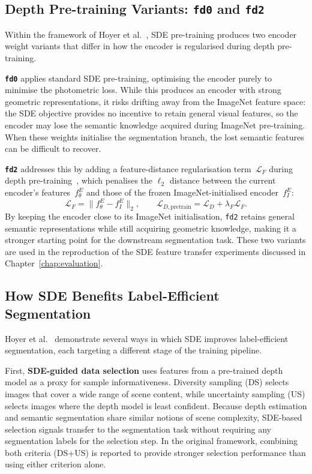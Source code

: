 \subsection{Depth Pre-training Variants: \texttt{fd0} and \texttt{fd2}}
\label{sec:fd0-fd2}

Within the framework of Hoyer et al.~\cite{hoyer2023improving}, SDE
pre-training produces two encoder weight variants that differ in how the
encoder is regularised during depth pre-training.

\textbf{\texttt{fd0}} applies standard SDE pre-training, optimising the
encoder purely to minimise the photometric loss. While this produces an
encoder with strong geometric representations, it risks drifting away
from the ImageNet feature space: the SDE objective provides no incentive
to retain general visual features, so the encoder may lose the semantic
knowledge acquired during ImageNet pre-training. When these weights
initialise the segmentation branch, the lost semantic features can be
difficult to recover.

\textbf{\texttt{fd2}} addresses this by adding a feature-distance
regularisation term~$\mathcal{L}_F$ during depth
pre-training~\cite{hoyer2023improving}, which penalises the $\ell_2$
distance between the current encoder's features~$f^E_\theta$ and those
of the frozen ImageNet-initialised encoder~$f^E_I$:
\[
    \mathcal{L}_F = \| f^E_\theta - f^E_I \|_2,
    \qquad
    \mathcal{L}_{D,\text{pretrain}} = \mathcal{L}_D + \lambda_F \mathcal{L}_F.
\]
By keeping the encoder close to its ImageNet initialisation, \texttt{fd2}
retains general semantic representations while still acquiring geometric
knowledge, making it a stronger starting point for the downstream
segmentation task. These two variants are used in the reproduction of the
SDE feature transfer experiments discussed in Chapter~\ref{chap:evaluation}.

\subsection{How SDE Benefits Label-Efficient Segmentation}

Hoyer et al.~\cite{hoyer2023improving} demonstrate several ways in which
SDE improves label-efficient segmentation, each targeting a
different stage of the training pipeline.

First, \textbf{SDE-guided data selection} uses features from a
pre-trained depth model as a proxy for sample informativeness. Diversity
sampling (DS) selects images that cover a wide range of scene content,
while uncertainty sampling (US) selects images where the depth model is
least confident. Because depth estimation and semantic segmentation share
similar notions of scene complexity, SDE-based selection signals transfer
to the segmentation task without requiring any segmentation labels for
the selection step. In the original framework, combining both criteria
(DS+US) is reported to provide stronger selection performance than using
either criterion alone.

